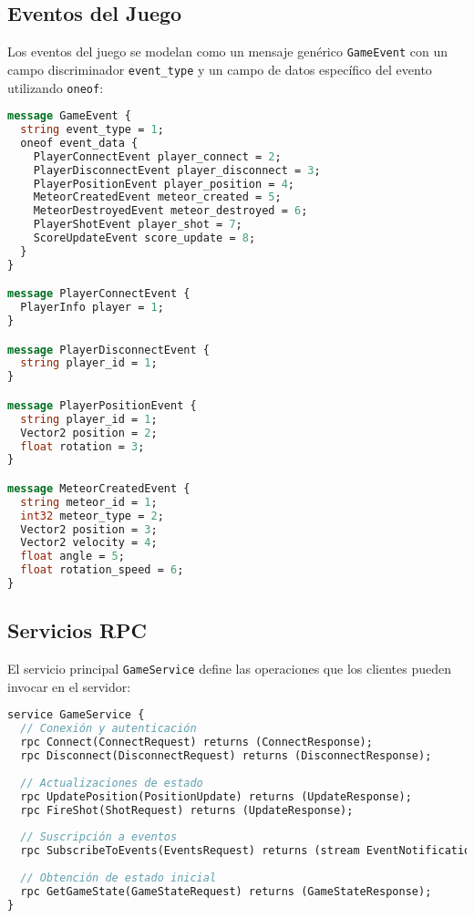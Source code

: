 \documentclass[11pt,letterpaper]{article}
\begin{document}
\subsection{Eventos del Juego}

Los eventos del juego se modelan como un mensaje genérico \texttt{GameEvent} con un campo discriminador \texttt{event\_type} y un campo de datos específico del evento utilizando \texttt{oneof}:

\begin{lstlisting}[language=proto, caption=Definición de eventos del juego]
message GameEvent {
  string event_type = 1;
  oneof event_data {
    PlayerConnectEvent player_connect = 2;
    PlayerDisconnectEvent player_disconnect = 3;
    PlayerPositionEvent player_position = 4;
    MeteorCreatedEvent meteor_created = 5;
    MeteorDestroyedEvent meteor_destroyed = 6;
    PlayerShotEvent player_shot = 7;
    ScoreUpdateEvent score_update = 8;
  }
}

message PlayerConnectEvent {
  PlayerInfo player = 1;
}

message PlayerDisconnectEvent {
  string player_id = 1;
}

message PlayerPositionEvent {
  string player_id = 1;
  Vector2 position = 2;
  float rotation = 3;
}

message MeteorCreatedEvent {
  string meteor_id = 1;
  int32 meteor_type = 2;
  Vector2 position = 3;
  Vector2 velocity = 4;
  float angle = 5;
  float rotation_speed = 6;
}
\end{lstlisting}

\subsection{Servicios RPC}

El servicio principal \texttt{GameService} define las operaciones que los clientes pueden invocar en el servidor:

\begin{lstlisting}[language=proto, caption=Definición del servicio GameService]
service GameService {
  // Conexión y autenticación
  rpc Connect(ConnectRequest) returns (ConnectResponse);
  rpc Disconnect(DisconnectRequest) returns (DisconnectResponse);
  
  // Actualizaciones de estado
  rpc UpdatePosition(PositionUpdate) returns (UpdateResponse);
  rpc FireShot(ShotRequest) returns (UpdateResponse);
  
  // Suscripción a eventos
  rpc SubscribeToEvents(EventsRequest) returns (stream EventNotification);
  
  // Obtención de estado inicial
  rpc GetGameState(GameStateRequest) returns (GameStateResponse);
}
\end{lstlisting}
\end{document}
